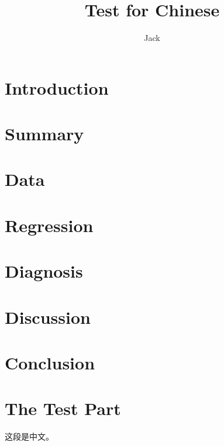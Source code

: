 \documentclass{article}
\title{Test for Chinese}
\author{Jack}
\begin{document}
\maketitle
\section{Introduction}
\section{Summary}
\section{Data}
\section{Regression}
\section{Diagnosis}
\section{Discussion}
\section{Conclusion}
\section{The Test Part}

这段是中文。
\end{document}
